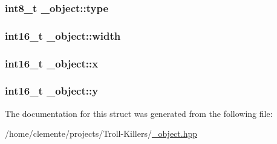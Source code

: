 \subsubsection[{type}]{\setlength{\rightskip}{0pt plus 5cm}int8\+\_\+t \+\_\+object\+::type}\label{struct__object_a4ffae0568ef6772f8ebefa0997f79243}
\hypertarget{struct__object_a7dff64a3cc71a49786c1052bb6c250ca}{}
\subsubsection[{width}]{\setlength{\rightskip}{0pt plus 5cm}int16\+\_\+t \+\_\+object\+::width}\label{struct__object_a7dff64a3cc71a49786c1052bb6c250ca}
\hypertarget{struct__object_adb6e178c2aa0bc48f5db6d85106c1680}{}
\subsubsection[{x}]{\setlength{\rightskip}{0pt plus 5cm}int16\+\_\+t \+\_\+object\+::x}\label{struct__object_adb6e178c2aa0bc48f5db6d85106c1680}
\hypertarget{struct__object_a48f88904fef6cb2f4ea22029174d76bc}{}
\subsubsection[{y}]{\setlength{\rightskip}{0pt plus 5cm}int16\+\_\+t \+\_\+object\+::y}\label{struct__object_a48f88904fef6cb2f4ea22029174d76bc}


The documentation for this struct was generated from the following file\+:\begin{DoxyCompactItemize}
\item 
/home/clemente/projects/\+Troll-\/\+Killers/\hyperlink{__object_8hpp}{\+\_\+object.\+hpp}\end{DoxyCompactItemize}
